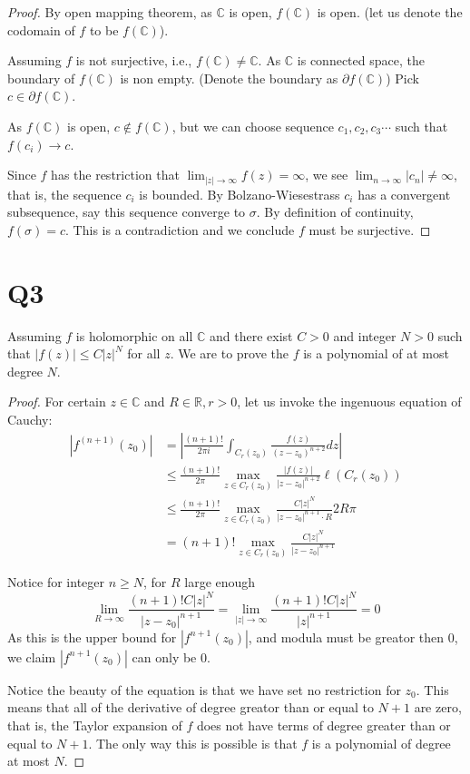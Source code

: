 \documentclass[12pt, a4paper]{article}
\theoremstyle{definition}
\theoremstyle{remark}
\newcommand{\bb}[1]{\mathbb{#1}}
\begin{document}
\begin{proof}
	By open mapping theorem, as $\bb{C}$ is open, $f(\bb{C})$ is open. (let us denote the codomain of $f$ to be $f(\bb{C})$). 

	Assuming $f$ is not surjective, i.e., $f(\bb{C}) \neq \bb{C}$. As $\bb{C}$ is connected space, the boundary of $f(\bb{C})$ is non empty. (Denote the boundary as $\partial f(\bb{C})$)
	Pick $c \in \partial f(\bb{C})$. 

	As $f(\bb{C})$ is open, $c \notin f(\bb{C})$, but we can choose sequence $c_1, c_2, c_3 \cdots$ such that $f(c_i) \rightarrow c$.

	Since $f$ has the restriction that $\lim_{|z| \rightarrow \infty} f(z) = \infty$, we see $\lim_{n \rightarrow \infty} |c_n| \neq \infty$, that is, the sequence $c_i$ is bounded. By Bolzano-Wiesestrass $c_i$ has a convergent subsequence, say this sequence converge to $\sigma$. By definition of continuity, $f(\sigma) =c$. This is a contradiction and we conclude $f$ must be surjective.
\end{proof}

\section{Q3}

Assuming $f$ is holomorphic on all $\bb{C}$ and there exist $C>0$ and integer $N > 0$ such that $|f(z)| \leq C|z|^{N}$ for all $z$. We are to prove the $f$ is a polynomial of at most degree $N$.

\begin{proof}
	For certain $z \in \bb{C}$ and $R \in \bb{R}, r>0$, let us invoke the ingenuous equation of Cauchy:
	\begin{align}\label{cauchy:q3}
		|f^{(n+1)}(z_0)| 
		&=
		\left|\frac{(n+1)!}{2\pi i} \int _{C_r(z_0)} \frac{f(z)}{(z-z_0)^{n+2}} dz \right| 
		\\
		&\leq
		\frac{(n+1)!}{2\pi} \max_{z \in C_r(z_0)} \frac{|f(z)|}{|z-z_0|^{n+2}} \ell(C_r(z_0))	
		\\
		&\leq 
		\frac{(n+1)!}{2\pi} \max_{z \in C_r(z_0)} \frac{C|z|^N}{|z-z_0|^{n+1}\cdot R} 2R \pi 	
		\\
		&=
		(n+1)! \max_{z \in C_r(z_0)} \frac{C|z|^N}{|z-z_0|^{n+1}}
	\end{align}

	Notice for integer $n \geq N$, for $R$ large enough
	\begin{equation}
		\lim_{R \rightarrow \infty} 
    		\frac{(n+1)!C |z|^{N}}{|z-z_0|^{n+1}} =
		\lim_{|z| \rightarrow \infty} 
		    \frac{(n+1)!C |z|^N}{|z|^{n+1}} = 0
	\end{equation}
	As this is the upper bound for $|f^{n+1}(z_0)|$, and modula must be greator then 0, we claim $|f^{n+1}(z_0)|$ can only be $0$.

	Notice the beauty of the equation is that we have set no restriction for $z_0$.
	This means that all of the derivative of degree greator than or equal to $N+1$ are zero, that is, the Taylor expansion of $f$ does not have terms of degree greater than or equal to $N+1$. 
	The only way this is possible is that $f$ is a polynomial of degree at most $N$.
\end{proof}
\end{document}
